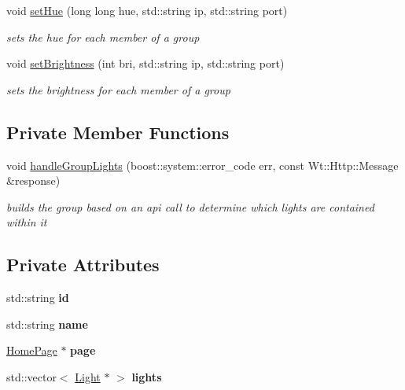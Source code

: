 \begin{DoxyCompactItemize}
void \hyperlink{class_light_group_a9cf17fe345ba9ca946efdec08cd5dec4}{set\+Hue} (long long hue, std\+::string ip, std\+::string port)
\begin{DoxyCompactList}\small\item\em sets the hue for each member of a group \end{DoxyCompactList}\item 
void \hyperlink{class_light_group_a679f84c1478e032819f34977e16d531a}{set\+Brightness} (int bri, std\+::string ip, std\+::string port)
\begin{DoxyCompactList}\small\item\em sets the brightness for each member of a group \end{DoxyCompactList}\end{DoxyCompactItemize}
\subsection*{Private Member Functions}
\begin{DoxyCompactItemize}
\item 
void \hyperlink{class_light_group_a69129340632df0060208a0715e65fe81}{handle\+Group\+Lights} (boost\+::system\+::error\+\_\+code err, const Wt\+::\+Http\+::\+Message \&response)
\begin{DoxyCompactList}\small\item\em builds the group based on an api call to determine which lights are contained within it \end{DoxyCompactList}\end{DoxyCompactItemize}
\subsection*{Private Attributes}
\begin{DoxyCompactItemize}
\item 
\mbox{\label{class_light_group_ad07ddbd5a61f47f86b1d1606dba9135e}} 
std\+::string {\bfseries id}
\item 
\mbox{\label{class_light_group_ae5633812bb0a731a10528f92c52aff53}} 
std\+::string {\bfseries name}
\item 
\mbox{\label{class_light_group_aa8a851323032ba1a24ce4b4bfbb769ec}} 
\hyperlink{class_home_page}{Home\+Page} $\ast$ {\bfseries page}
\item 
\mbox{\label{class_light_group_a35d7236e075e2c34032828257fc4ae4d}} 
std\+::vector$<$ \hyperlink{class_light}{Light} $\ast$ $>$ {\bfseries lights}
\end{DoxyCompactItemize}


